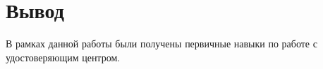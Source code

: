 \chapter{Вывод}

В рамках данной работы были получены первичные навыки по работе с удостоверяющим центром.
